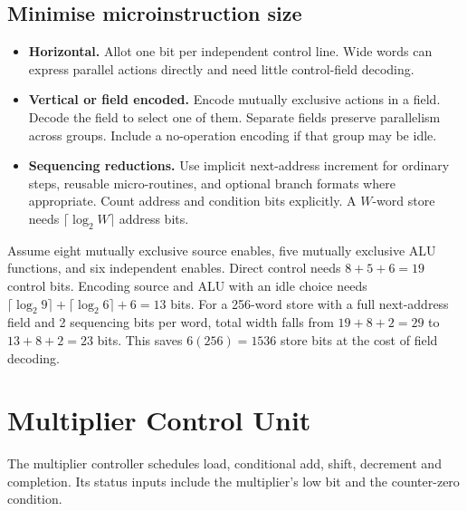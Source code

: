 \documentclass[12pt,a4paper]{article}
\begin{document}
\subsection{Minimise microinstruction size}
\begin{itemize}[leftmargin=*,itemsep=3pt]
\item \textbf{Horizontal.} Allot one bit per independent control line. Wide words can express parallel actions directly and need little control-field decoding.
\item \textbf{Vertical or field encoded.} Encode mutually exclusive actions in a field. Decode the field to select one of them. Separate fields preserve parallelism across groups. Include a no-operation encoding if that group may be idle.
\item \textbf{Sequencing reductions.} Use implicit next-address increment for ordinary steps, reusable micro-routines, and optional branch formats where appropriate. Count address and condition bits explicitly. A $W$-word store needs $\lceil\log_2W\rceil$ address bits.
\end{itemize}
\begin{tcolorbox}[examplebox,title={Compute control-store width}]
Assume eight mutually exclusive source enables, five mutually exclusive ALU functions, and six independent enables. Direct control needs $8+5+6=19$ control bits. Encoding source and ALU with an idle choice needs $\lceil\log_2 9\rceil+\lceil\log_2 6\rceil+6=13$ bits. For a 256-word store with a full next-address field and 2 sequencing bits per word, total width falls from $19+8+2=29$ to $13+8+2=23$ bits. This saves $6(256)=1536$ store bits at the cost of field decoding.
\end{tcolorbox}

\section{Multiplier Control Unit}
\begin{tcolorbox}[defbox,title={Sequential multiplier controller}]
The multiplier controller schedules load, conditional add, shift, decrement and completion. Its status inputs include the multiplier's low bit and the counter-zero condition.
\end{tcolorbox}
\end{document}

